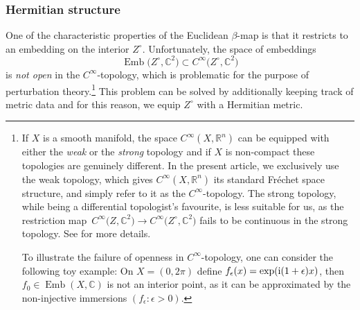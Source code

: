 \documentclass[10pt,a4paper]{amsart}
\numberwithin{equation}{section}
\theoremstyle{definition}
\newcommand{\R}{\mathbb{R}} %
\newcommand{\C}{\mathbb{C}} %
\newcommand{\1}{{\bf 1}}
\begin{document}
\subsubsection{Hermitian structure} \label{s_hermitian}
One of the characteristic properties of the Euclidean $\beta$-map
is that it restricts to an embedding on the interior $Z^\circ$. Unfortunately, the space of embeddings
\[
	\operatorname{Emb}\bigl(Z^\circ,\C^2\bigr)\subset C^\infty\bigl(Z^\circ,\C^2\bigr)
\]
is {\it not open} in the $C^\infty$-topology, which is problematic for the purpose of perturbation theory.\footnote{If $X$ is a smooth manifold, the space $C^\infty(X,\R^n)$ can be equipped with either the {\it weak} or the {\it strong} topology and if $X$ is non-compact these topologies are genuinely different. In the present article, we exclusively use the weak topology, which gives $C^\infty(X,\R^n)$ its standard Fr{\'e}chet space structure, and simply refer to it as the $C^\infty$-topology. The strong topology, while being a differential topologist's favourite, is less suitable for us, as the restriction map~${C^\infty\bigl(Z,\C^2\bigr)\rightarrow C^\infty\bigl(Z^\circ,\C^2\bigr)}$ fails to be continuous in the strong topology. See \cite[Chapter~2]{Hir76} for more details.

 To illustrate the failure of openness in $C^\infty$-topology, one can consider the following toy example: On $X=(0,2\pi)$ define $f_\epsilon(x)=\exp({\rm i}(1+\epsilon)x)$, then $f_0\in \operatorname{Emb}(X,\C)$ is not an interior point, as it can be approximated by the non-injective immersions $(f_\epsilon : \epsilon>0)$.
} This problem can be solved by additionally keeping track of metric data and for this reason, we equip $Z^\circ$ with a Hermitian metric.
\end{document}
